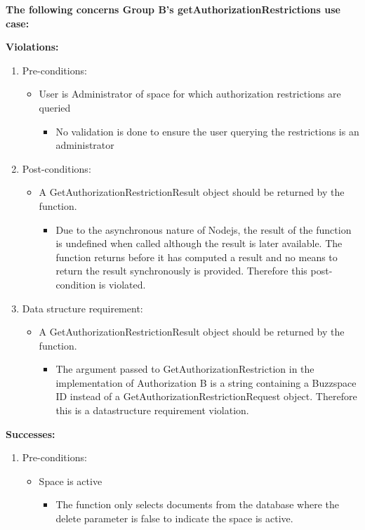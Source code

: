 

\textbf{The following concerns Group B's getAuthorizationRestrictions use case:}\newline


\textbf{Violations:}
\begin{enumerate}
	\item Pre-conditions:	
	\begin{itemize}
		\item User is Administrator of space for which authorization restrictions are queried
		\begin{itemize}
				\item No validation is done to ensure the user querying the restrictions is an administrator
		\end{itemize}
	\end{itemize}
	
	\item Post-conditions:
	\begin{itemize}
		\item  A GetAuthorizationRestrictionResult object should be returned by the function. 
		\begin{itemize}
				\item Due to the asynchronous nature of Nodejs, the result of the function is undefined when called although the result is later available. The function returns before it has computed a result and no means to return the result synchronously is provided. Therefore this post-condition is violated.
		\end{itemize}
	\end{itemize}
	
	\item Data structure requirement:
	\begin{itemize}
		\item  A GetAuthorizationRestrictionResult object should be returned by the function. 
		\begin{itemize}
				\item The argument passed to GetAuthorizationRestriction in the implementation of Authorization B is a string containing a Buzzspace ID instead of a GetAuthorizationRestrictionRequest object. Therefore this is a datastructure requirement violation.
		\end{itemize}
	\end{itemize}
		
\end{enumerate}

\textbf{Successes:}
\begin{enumerate}
	\item Pre-conditions:	
	\begin{itemize}
		\item Space is active
		\begin{itemize}
				\item The function only selects documents from the database where the delete parameter is false to indicate the space is active.
		\end{itemize}
	\end{itemize}	
\end{enumerate}


